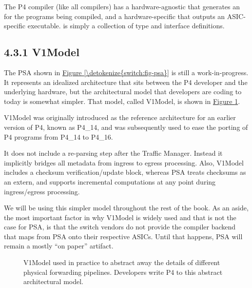 \documentclass[letterpaper,11pt,english]{sphinxmanual}
\let\sphinxpxdimen\pdfpxdimen\else\newdimen\sphinxpxdimen
\begin{document}
The P4 compiler (like all compilers) has a hardware-agnostic
 that generates an  for the
programs being compiled, and a hardware-specific  that
outputs an ASIC-specific executable.  is simply a collection
of type and interface definitions.


\subsection{4.3.1 V1Model}
\label{\detokenize{switch:v1model}}
The PSA shown in \hyperref[\detokenize{switch:fig-psa}]{Figure \ref{\detokenize{switch:fig-psa}}} is still a
work-in-progress. It represents an idealized architecture that sits
between the P4 developer and the underlying hardware, but the
architectural model that developers are coding to today is somewhat
simpler. That model, called V1Model, is shown in \hyperref[\detokenize{switch:fig-v1model}]{Figure \ref{\detokenize{switch:fig-v1model}}}. %
\begin{footnote}[1]\sphinxAtStartFootnote
V1Model was originally introduced as the reference architecture
for an earlier version of P4, known as P4\_14, and was
subsequently used to ease the porting of P4 programs from P4\_14
to P4\_16.
%
\end{footnote} It does not include a re-parsing step after the
Traffic Manager. Instead it implicitly bridges all metadata from
ingress to egress processing. Also, V1Model includes a checksum
verification/update block, whereas PSA treats checksums as an extern,
and supports incremental computations at any point during
ingress/egress processing.

We will be using this simpler model throughout the rest of the
book. As an aside, the most important factor in why V1Model is widely
used and that is not the case for PSA, is that the switch vendors do
not provide the compiler backend that maps from PSA onto their
respective ASICs. Until that happens, PSA will remain a mostly “on
paper” artifact.

\begin{figure}[htbp]
\centering
\capstart

\noindent\sphinxincludegraphics[width=650\sphinxpxdimen]{{Slide22}.png}
\caption{V1Model used in practice to abstract away the details of different
physical forwarding pipelines. Developers write P4 to this
abstract architectural model.}\label{\detokenize{switch:id14}}\label{\detokenize{switch:fig-v1model}}\end{figure}
\end{document}

